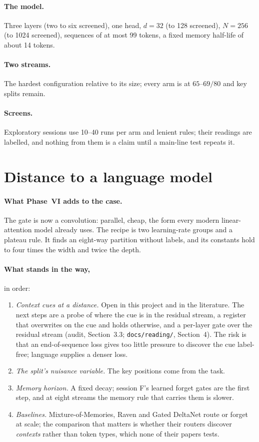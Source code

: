 \documentclass[11pt]{article}
\begin{document}
\paragraph{The model.} Three layers (two to six screened), one head, $d = 32$ (to 128 screened), $N = 256$ (to 1024 screened), sequences of at most 99 tokens, a fixed memory half-life of about 14 tokens.

\paragraph{Two streams.} The hardest configuration relative to its size; every arm is at $65$--$69/80$ and key splits remain.

\paragraph{Screens.} Exploratory sessions use 10--40 runs per arm and lenient rules; their readings are labelled, and nothing from them is a claim until a main-line test repeats it.

\section{Distance to a language model}
\label{sec:lm}

\paragraph{What Phase~VI adds to the case.} The gate is now a convolution: parallel, cheap, the form every modern linear-attention model already uses. The recipe is two learning-rate groups and a plateau rule. It finds an eight-way partition without labels, and its constants hold to four times the width and twice the depth.

\paragraph{What stands in the way,} in order:
\begin{enumerate}
\item \emph{Context cues at a distance.} Open in this project and in the literature. The next steps are a probe of where the cue is in the residual stream, a register that overwrites on the cue and holds otherwise, and a per-layer gate over the residual stream (audit, Section~3.3; \texttt{docs/reading/}, Section~4). The risk is that an end-of-sequence loss gives too little pressure to discover the cue label-free; language supplies a denser loss.
\item \emph{The split's nuisance variable.} The key positions come from the task.
\item \emph{Memory horizon.} A fixed decay; session F's learned forget gates are the first step, and at eight streams the memory rule that carries them is slower.
\item \emph{Baselines.} Mixture-of-Memories, Raven and Gated DeltaNet route or forget at scale; the comparison that matters is whether their routers discover \emph{contexts} rather than token types, which none of their papers tests.
\end{enumerate}
\end{document}
